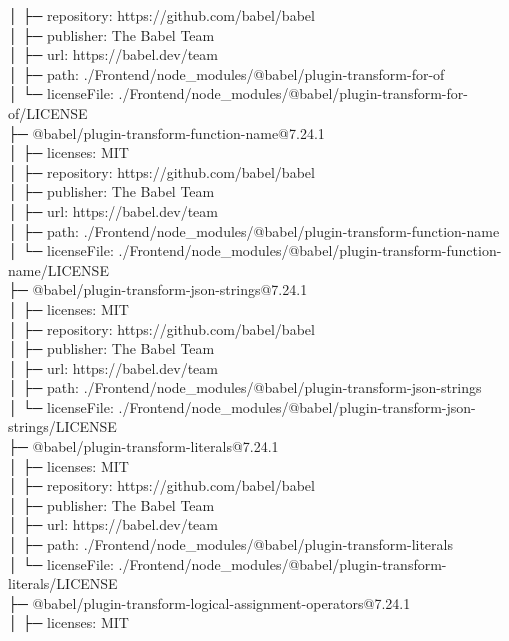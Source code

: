 \documentclass[
    paper=a4,
    twoside=false,
    parskip=half,
    listof=entryprefix,
    listof=totoc,
    index=totoc,
    bibliography=totoc,
    headsepline,
]{scrbook}
\begin{document}
    │  ├─ repository: https://github.com/babel/babel\\
    │  ├─ publisher: The Babel Team\\
    │  ├─ url: https://babel.dev/team\\
    │  ├─ path: ./Frontend/node\_modules/@babel/plugin-transform-for-of\\
    │  └─ licenseFile: ./Frontend/node\_modules/@babel/plugin-transform-for-of/LICENSE\\
    ├─ @babel/plugin-transform-function-name@7.24.1\\
    │  ├─ licenses: MIT\\
    │  ├─ repository: https://github.com/babel/babel\\
    │  ├─ publisher: The Babel Team\\
    │  ├─ url: https://babel.dev/team\\
    │  ├─ path: ./Frontend/node\_modules/@babel/plugin-transform-function-name\\
    │  └─ licenseFile: ./Frontend/node\_modules/@babel/plugin-transform-function-name/LICENSE\\
    ├─ @babel/plugin-transform-json-strings@7.24.1\\
    │  ├─ licenses: MIT\\
    │  ├─ repository: https://github.com/babel/babel\\
    │  ├─ publisher: The Babel Team\\
    │  ├─ url: https://babel.dev/team\\
    │  ├─ path: ./Frontend/node\_modules/@babel/plugin-transform-json-strings\\
    │  └─ licenseFile: ./Frontend/node\_modules/@babel/plugin-transform-json-strings/LICENSE\\
    ├─ @babel/plugin-transform-literals@7.24.1\\
    │  ├─ licenses: MIT\\
    │  ├─ repository: https://github.com/babel/babel\\
    │  ├─ publisher: The Babel Team\\
    │  ├─ url: https://babel.dev/team\\
    │  ├─ path: ./Frontend/node\_modules/@babel/plugin-transform-literals\\
    │  └─ licenseFile: ./Frontend/node\_modules/@babel/plugin-transform-literals/LICENSE\\
    ├─ @babel/plugin-transform-logical-assignment-operators@7.24.1\\
    │  ├─ licenses: MIT\\
\end{document}
